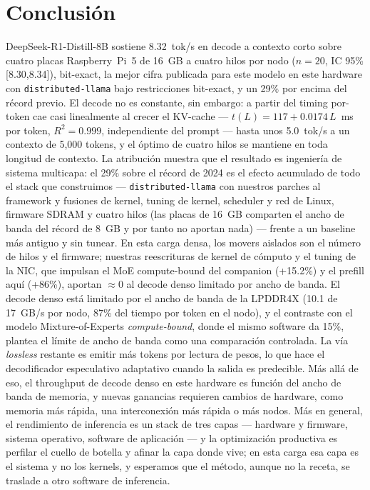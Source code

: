\documentclass[10pt,a4paper]{article}
\begin{document}
\section{Conclusión}
DeepSeek-R1-Distill-8B sostiene 8.32~tok/s en decode a contexto corto sobre cuatro placas Raspberry~Pi~5 de 16~GB a cuatro hilos por nodo ($n{=}20$, IC 95\% [8.30,8.34]), bit-exact, la mejor cifra publicada para este modelo en este hardware con \texttt{distributed-llama} bajo restricciones bit-exact, y un 29\% por encima del récord previo. El decode no es constante, sin embargo: a partir del timing por-token cae casi linealmente al crecer el KV-cache --- $t(L){=}117{+}0.0174\,L$~ms por token, $R^2{=}0.999$, independiente del prompt --- hasta unos 5.0~tok/s a un contexto de 5{,}000 tokens, y el óptimo de cuatro hilos se mantiene en toda longitud de contexto. La atribución muestra que el resultado es ingeniería de sistema multicapa: el 29\% sobre el récord de 2024 es el efecto acumulado de todo el stack que construimos --- \texttt{distributed-llama} con nuestros parches al framework y fusiones de kernel, tuning de kernel, scheduler y red de Linux, firmware SDRAM y cuatro hilos (las placas de 16~GB comparten el ancho de banda del récord de 8~GB y por tanto no aportan nada) --- frente a un baseline más antiguo y sin tunear. En esta carga densa, los movers aislados son el número de hilos y el firmware; nuestras reescrituras de kernel de cómputo y el tuning de la NIC, que impulsan el MoE compute-bound del companion (+15.2\%) y el prefill aquí (+86\%), aportan $\approx$0 al decode denso limitado por ancho de banda. El decode denso está limitado por el ancho de banda de la LPDDR4X (10.1 de 17~GB/s por nodo, 87\% del tiempo por token en el nodo), y el contraste con el modelo Mixture-of-Experts \emph{compute-bound}, donde el mismo software da 15\%, plantea el límite de ancho de banda como una comparación controlada. La vía \emph{lossless} restante es emitir más tokens por lectura de pesos, lo que hace el decodificador especulativo adaptativo cuando la salida es predecible. Más allá de eso, el throughput de decode denso en este hardware es función del ancho de banda de memoria, y nuevas ganancias requieren cambios de hardware, como memoria más rápida, una interconexión más rápida o más nodos. Más en general, el rendimiento de inferencia es un stack de tres capas --- hardware y firmware, sistema operativo, software de aplicación --- y la optimización productiva es perfilar el cuello de botella y afinar la capa donde vive; en esta carga esa capa es el sistema y no los kernels, y esperamos que el método, aunque no la receta, se traslade a otro software de inferencia.
\end{document}
